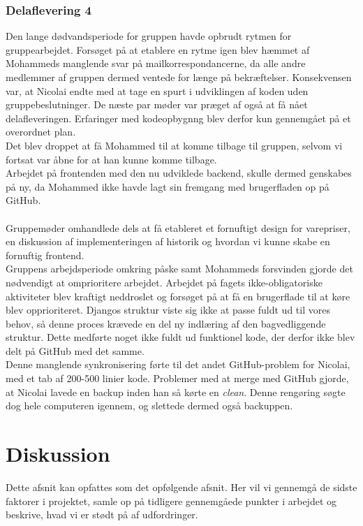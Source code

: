 \documentclass[]{article}
\begin{document}
\subsubsection{Delaflevering 4}
\noindent Den lange dødvandsperiode for gruppen havde opbrudt rytmen for gruppearbejdet. Forsøget på at etablere en rytme igen blev hæmmet af Mohammeds manglende svar på mailkorrespondancerne, da alle andre medlemmer af gruppen dermed ventede for længe på bekræftelser. Konsekvensen var, at Nicolai endte med at tage en spurt i udviklingen af koden uden gruppebeslutninger. De næste par møder var præget af også at få nået delafleveringen. Erfaringer med kodeopbygnng blev derfor kun gennemgået på et overordnet plan. \\
Det blev droppet at få Mohammed til at komme tilbage til gruppen, selvom vi fortsat var åbne for at han kunne komme tilbage.\\
Arbejdet på frontenden med den nu udviklede backend, skulle dermed genskabes på ny, da Mohammed ikke havde lagt sin fremgang med brugerfladen op på GitHub. \\ \\
Gruppemøder omhandlede dels at få etableret et fornuftigt design for varepriser, en diskussion af implementeringen af historik og hvordan vi kunne skabe en fornuftig frontend. \\
Gruppens arbejdsperiode omkring påske samt Mohammeds forsvinden gjorde det nødvendigt at omprioritere arbejdet. Arbejdet på fagets ikke-obligatoriske aktiviteter blev kraftigt neddroslet og forsøget på at få en brugerflade til at køre blev opprioriteret. Djangos struktur viste sig ikke at passe fuldt ud til vores behov, så denne proces krævede en del ny indlæring af den bagvedliggende struktur. Dette medførte noget ikke fuldt ud funktionel kode, der derfor ikke blev delt på GitHub med det samme. \\
Denne manglende synkronisering førte til det andet GitHub-problem for Nicolai, med et tab af 200-500 linier kode. Problemer med at merge med GitHub gjorde, at Nicolai lavede en backup inden han så kørte en \textit{clean}. Denne rengøring søgte dog hele computeren igennem, og slettede dermed også backuppen.
\pagebreak[3]

\section{Diskussion} \label{Diskussion} %
Dette afsnit kan opfattes som det opfølgende afsnit. Her vil vi gennemgå de sidste faktorer i projektet, samle op på tidligere gennemgåede punkter i arbejdet og beskrive, hvad vi er stødt på af udfordringer.
\end{document}
